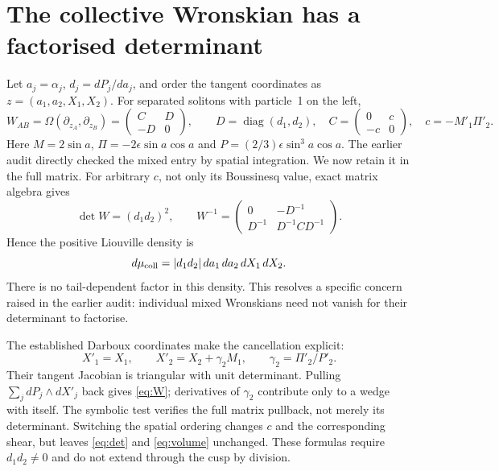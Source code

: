 \documentclass[11pt]{article}
\begin{document}
\section{The collective Wronskian has a factorised determinant}
Let $a_j=\alpha_j$, $d_j=dP_j/da_j$, and order the tangent coordinates as
$z=(a_1,a_2,X_1,X_2)$. For separated solitons with particle~1 on the left,
\begin{equation}\label{eq:W}
 W_{AB}=\Omega(\partial_{z_A},\partial_{z_B})
 =\begin{pmatrix}C&D\\-D&0\end{pmatrix},\qquad
 D=\operatorname{diag}(d_1,d_2),\quad
 C=\begin{pmatrix}0&c\\-c&0\end{pmatrix},\quad
 c=-M'_1\Pi'_2.
\end{equation}
Here $M=2\sin a$, $\Pi=-2\epsilon\sin a\cos a$ and
$P=(2/3)\epsilon\sin^3a\cos a$. The earlier audit directly checked the
mixed entry by spatial integration. We now retain it in the full matrix.
For arbitrary $c$, not only its Boussinesq value, exact matrix algebra gives
\begin{equation}\label{eq:det}
 \det W=(d_1d_2)^2,\qquad
 W^{-1}=\begin{pmatrix}0&-D^{-1}\\D^{-1}&D^{-1}CD^{-1}\end{pmatrix}.
\end{equation}
Hence the positive Liouville density is
\begin{equation}\label{eq:volume}
 d\mu_{\rm coll}=|d_1d_2|\,da_1\,da_2\,dX_1\,dX_2.
\end{equation}
There is no tail-dependent factor in this density. This resolves a specific
concern raised in the earlier audit: individual mixed Wronskians need not
vanish for their determinant to factorise.

The established Darboux coordinates make the cancellation explicit:
\begin{equation}
 X'_1=X_1,\qquad X'_2=X_2+\gamma_2 M_1,\qquad
 \gamma_2=\Pi'_2/P'_2.
\end{equation}
Their tangent Jacobian is triangular with unit determinant. Pulling
$\sum_jdP_j\wedge dX'_j$ back gives \eqref{eq:W}; derivatives of $\gamma_2$
contribute only to a wedge with itself. The symbolic test verifies the full
matrix pullback, not merely its determinant. Switching the spatial ordering
changes $c$ and the corresponding shear, but leaves \eqref{eq:det} and
\eqref{eq:volume} unchanged. These formulas require $d_1d_2\ne0$ and do not
extend through the cusp by division.
\end{document}
